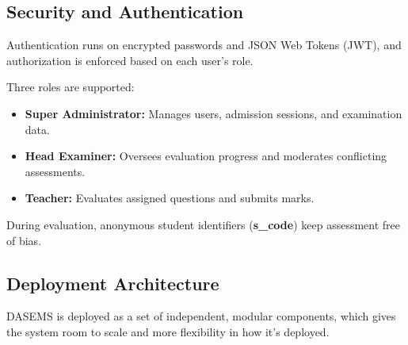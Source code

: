 \subsection{Security and Authentication}

Authentication runs on encrypted passwords and JSON Web Tokens (JWT), and authorization is enforced based on each user's role.

Three roles are supported:

\begin{itemize}
    \item \textbf{Super Administrator:} Manages users, admission sessions, and examination data.
    \item \textbf{Head Examiner:} Oversees evaluation progress and moderates conflicting assessments.
    \item \textbf{Teacher:} Evaluates assigned questions and submits marks.
\end{itemize}

During evaluation, anonymous student identifiers (\textbf{s\_code}) keep assessment free of bias.

\subsection{Deployment Architecture}

DASEMS is deployed as a set of independent, modular components, which gives the system room to scale and more flexibility in how it's deployed.

